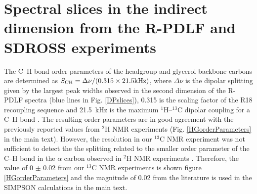 \documentclass[journal=jpcbfk,manuscript=article]{achemso}
\begin{document}
\pagebreak
\section{Spectral slices in the indirect dimension from the R-PDLF and SDROSS experiments}

The C--H bond order parameters of the headgroup and glycerol backbone carbons are determined 
as $S_{\rm CH}=\Delta\nu/(0.315\times21.5  {\rm kHz})$, where $\Delta\nu$ is the dipolar splitting
given by the largest peak widths observed in the second dimension of the R-PDLF spectra
(blue lines in Fig. \ref{DPslices}), 0.315 is the scaling factor of the R18 recoupling sequence 
and 21.5~kHz is the maximum $^1$H--$^{13}$C dipolar coupling for a C--H bond \cite{dvinskikh04}.
The resulting order parameters are in good agreement with the previously reported values
from $^2$H NMR experiments \cite{browning80} (Fig. \ref{HGorderParameters} in the main text).
However, the resolution in our $^{13}$C NMR experiment was not sufficient to detect the
the splitting related to the smaller order parameter of the C--H bond in the $\alpha$ carbon
observed in $^2$H NMR experiments \cite{browning80}. Therefore, the value of  0 $\pm$ 0.02 from our
$^{13}$C NMR experiments is shown figure \ref{HGorderParameters} 
and the magnitude of 0.02 from the literature is used in the SIMPSON calculations in the main text.
\end{document}
